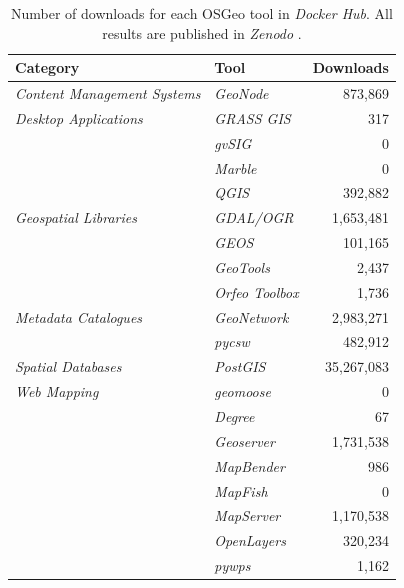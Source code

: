 \documentclass[ijgi,article,submit,moreauthors,pdftex]{Definitions/mdpi}
\begin{document}
\begin{table}[!h]
    \begin{center}
        \begin{tabular}{l l r}
            \hline
            \hline
            \textbf{Category} & \textbf{Tool} & \textbf{Downloads}\\ 
            \hline
            \textit{Content Management Systems} & \textit{GeoNode} & 873,869\\
            \hline
            \textit{Desktop Applications} & \textit{GRASS GIS} & 317\\ 
            & \textit{gvSIG} & 0\\
            & \textit{Marble} & 0\\
            & \textit{QGIS} & 392,882\\
            \hline
            \textit{Geospatial Libraries} & \textit{GDAL/OGR} & 1,653,481\\
            & \textit{GEOS} & 101,165\\ 
            & \textit{GeoTools} & 2,437\\ 
            & \textit{Orfeo Toolbox} & 1,736\\ 
            \hline
            \textit{Metadata Catalogues} & \textit{GeoNetwork} & 2,983,271\\ 
            & \textit{pycsw} & 482,912\\ 
            \hline
            \textit{Spatial Databases} & \textit{PostGIS} & 35,267,083\\ 
            \hline
            \textit{Web Mapping} & \textit{geomoose} & 0\\ 
            & \textit{Degree} & 67\\
            & \textit{Geoserver} & 1,731,538 \\
            & \textit{MapBender} & 986\\ 
            & \textit{MapFish} & 0\\
            & \textit{MapServer} & 1,170,538\\
            & \textit{OpenLayers} & 320,234\\
            & \textit{pywps} & 1,162\\
            \hline
            \hline 
        \end{tabular}
    \end{center}
    \caption{Number of downloads for each OSGeo tool in \textit{Docker Hub}. All results are published in \textit{Zenodo} \cite{Trilles2019}.}
    \label{tab:tab2}
\end{table}
\end{document}
